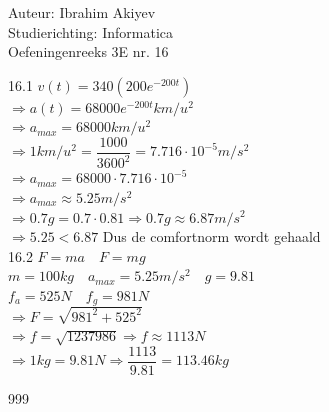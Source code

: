 \documentclass[a4paper]{article}
\begin{document}
\noindent \large Auteur: Ibrahim Akiyev \\
\noindent \large Studierichting: Informatica\\
\noindent \large Oefeningenreeks 3E nr. 16\\

\medskip

\normalsize

16.1 $v(t) = 340(200e^{-200t})$\\

$\Rightarrow a(t) = 68000e^{-200t} km/u^2$\\

$\Rightarrow a_{max} = 68000 km/u^2$\\

$\Rightarrow 1 km/u^2 = \dfrac{1000}{3600^2} = 7.716 \cdot 10^{-5} m/s^2$\\

$\Rightarrow a_{max} = 68000 \cdot 7.716 \cdot 10^{-5}$\\

$\Rightarrow a_{max} \approx 5.25 m/s^2$\\

$\Rightarrow 0.7g = 0.7 \cdot 0.81 \Rightarrow 0.7g \approx 6.87 m/s^2$\\

$\Rightarrow 5.25 < 6.87 $ Dus de comfortnorm wordt gehaald \\

16.2 $F = ma \quad F = mg$\\

$m = 100kg \quad  a_{max} = 5.25 m/s^2 \quad  g = 9.81$\\

$f_a = 525N \quad f_g = 981N$\\

$\Rightarrow F = \sqrt{981^2 + 525^2}$\\

$\Rightarrow f = \sqrt{1237986} \Rightarrow f \approx 1113N$\\

$\Rightarrow 1kg = 9.81N \Rightarrow \dfrac{1113}{9.81} = 113.46kg$\\


\begin{thebibliography}{999}
\end{thebibliography}
\end{document}
